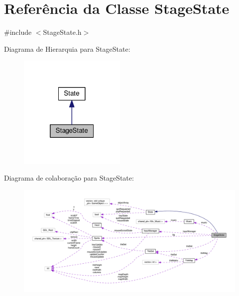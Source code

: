 \hypertarget{classStageState}{\section{Referência da Classe Stage\+State}
\label{classStageState}
}


{\ttfamily \#include $<$Stage\+State.\+h$>$}



Diagrama de Hierarquia para Stage\+State\+:\nopagebreak
\begin{figure}[H]
\begin{center}
\leavevmode
\includegraphics[width=145pt]{classStageState__inherit__graph}
\end{center}
\end{figure}


Diagrama de colaboração para Stage\+State\+:
\nopagebreak
\begin{figure}[H]
\begin{center}
\leavevmode
\includegraphics[width=350pt]{classStageState__coll__graph}
\end{center}
\end{figure}
